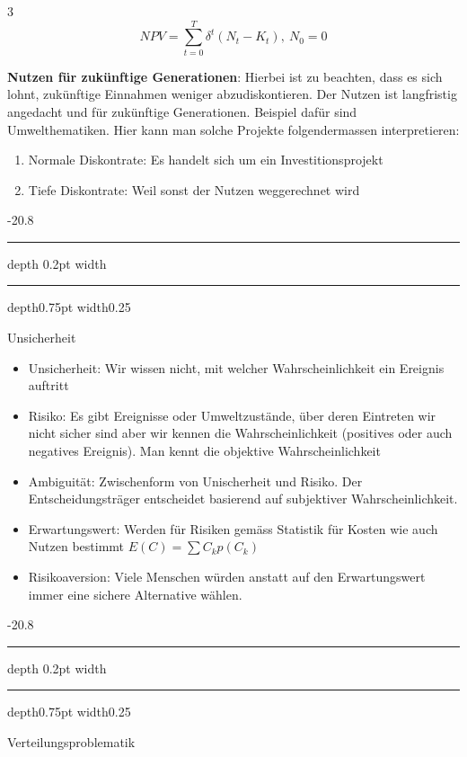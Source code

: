 \documentclass[9pt, landscape, fleqn]{scrartcl}
\makeatletter
\renewcommand{\subsection}{\@startsection{subsection}{1}{0mm}%
{-2\baselineskip}{0.8\baselineskip}%
{\hrule depth 0.2pt width\columnwidth\hrule depth0.75pt
width0.25\columnwidth\vspace*{1.2em}\large\bfseries\rmfamily}}
\makeatother
\begin{document}
\begin{multicols*}{3}
\begin{equation}
    NPV = \sum_{t=0}^T \delta^t \left( N_t - K_t\right),~ N_0 = 0
\end{equation}

\textbf{Nutzen für zukünftige Generationen}: Hierbei ist zu beachten, dass es sich lohnt, zukünftige Einnahmen weniger abzudiskontieren. Der Nutzen ist langfristig angedacht und für zukünftige Generationen. Beispiel dafür sind Umwelthematiken. Hier kann man solche Projekte folgendermassen interpretieren: 

\begin{enumerate}
    \item Normale Diskontrate: Es handelt sich um ein Investitionsprojekt
    \item Tiefe Diskontrate: Weil sonst der Nutzen weggerechnet wird 
\end{enumerate}

\subsection{Unsicherheit}

\begin{itemize}
    \item Unsicherheit: Wir wissen nicht, mit welcher Wahrscheinlichkeit ein Ereignis auftritt
    \item Risiko: Es gibt Ereignisse oder Umweltzustände, über deren Eintreten wir nicht sicher sind aber wir kennen die Wahrscheinlichkeit (positives oder auch negatives Ereignis). Man kennt die objektive Wahrscheinlichkeit
    \item Ambiguität: Zwischenform von Unischerheit und Risiko. Der Entscheidungsträger entscheidet basierend auf subjektiver Wahrscheinlichkeit. 
    \item Erwartungswert: Werden für Risiken gemäss Statistik für Kosten wie auch Nutzen bestimmt $E(C) = \sum C_k p(C_k)$
    \item Risikoaversion: Viele Menschen würden anstatt auf den Erwartungswert immer eine sichere Alternative wählen. 
\end{itemize}


\subsection{Verteilungsproblematik}


\end{multicols*}
\end{document}
